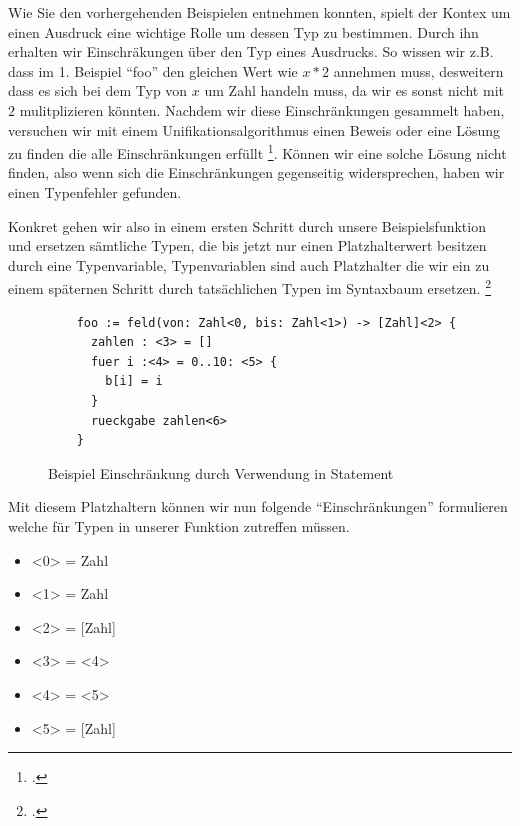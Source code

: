 \documentclass[a4paper, 12pt]{article}
\begin{document}
Wie Sie den vorhergehenden Beispielen entnehmen konnten, spielt der Kontex um einen Ausdruck eine wichtige Rolle um dessen Typ zu bestimmen.
Durch ihn erhalten wir Einschr\"akungen \"uber den Typ eines
Ausdrucks. So wissen wir z.B. dass im 1. Beispiel ``foo'' den gleichen Wert wie $x * 2$ annehmen muss, desweitern dass es sich bei dem Typ von $x$ um Zahl handeln muss, da wir es sonst nicht mit $2$ mulitplizieren k\"onnten. Nachdem wir diese Einschr\"ankungen gesammelt haben, versuchen wir mit einem Unifikationsalgorithmus einen Beweis
oder eine L\"osung zu finden die alle Einschr\"ankungen erf\"ullt \footcite[vgl.][44]{mgordon}. K\"onnen wir eine
solche L\"osung nicht finden, also wenn sich die Einschr\"ankungen gegenseitig
widersprechen, haben wir einen Typenfehler gefunden.

Konkret gehen wir also in einem ersten Schritt durch unsere Beispielsfunktion und ersetzen s\"amtliche
Typen, die bis jetzt nur einen Platzhalterwert besitzen durch eine Typenvariable,
Typenvariablen sind auch Platzhalter die wir ein zu einem sp\"aternen Schritt durch tats\"achlichen Typen im Syntaxbaum ersetzen. \footcite{tbe}

\begin{figure}[h]
  \caption{Beispiel Einschr\"ankung durch Verwendung in Statement}
  \begin{verbatim}
    foo := feld(von: Zahl<0, bis: Zahl<1>) -> [Zahl]<2> {
      zahlen : <3> = []
      fuer i :<4> = 0..10: <5> {
        b[i] = i
      }
      rueckgabe zahlen<6>
    }
  \end{verbatim}
\end{figure}

Mit diesem Platzhaltern k\"onnen wir nun folgende “Einschr\"ankungen” formulieren welche f\"ur Typen in unserer Funktion zutreffen m\"ussen.
\begin{itemize}
  \item{<0> = Zahl}
  \item{<1> = Zahl}
  \item{<2> = [Zahl]}
  \item{<3> = <4>}
  \item{<4> = <5>}
  \item{<5> = [Zahl]}
\end{itemize}
\end{document}
